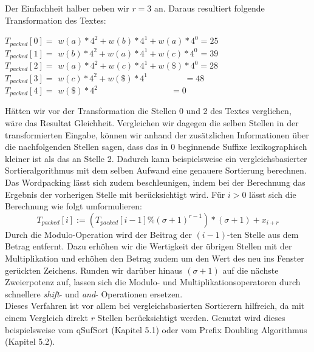 Der Einfachheit halber neben wir $r=3$ an. Daraus resultiert folgende Transformation des Textes:
\begin{flushleft}
$T_{packed}[0]=$ $w(a)* 4^{2}+w(b)* 4^{1}+w(a)*4^{0}=25$\\
$T_{packed}[1]=$ $w(b)* 4^{2}+w(a)* 4^{1}+w(c)*4^{0}\hspace{1pt} =39$\\
$T_{packed}[2]=$ $w(a)* 4^{2}+w(c)* 4^{1}+w(\$)*4^{0}=28$\\
$T_{packed}[3]=$ $w(c)* 4^{2}+w(\$)*4^{1}\hspace{52pt} =48$\\
$T_{packed}[4]=$ $w(\$)* 4^{2}\hspace{103pt}=0$
\end{flushleft}
Hätten wir vor der Transformation die Stellen 0 und 2 des Textes verglichen, wäre das Resultat Gleichheit. Vergleichen wir dagegen die selben Stellen in der transformierten Eingabe, können wir anhand der zusätzlichen Informationen über die nachfolgenden Stellen sagen, dass das in 0 beginnende Suffixe lexikographisch kleiner ist als das an Stelle 2. Dadurch kann beispielsweise ein vergleichsbasierter Sortieralgorithmus mit dem selben Aufwand eine genauere Sortierung berechnen.\\
Das Wordpacking lässt sich zudem beschleunigen, indem bei der Berechnung das Ergebnis der vorherigen Stelle mit berücksichtigt wird. Für $i > 0$ lässt sich die Berechnung wie folgt umformulieren:
\begin{equation}
T_{packed}[i] := (T_{packed}[i-1] \% (\sigma+1)^{r-1})*(\sigma+1) + x_{i+r}
\end{equation}
Durch die Modulo-Operation wird der Beitrag der $(i-1)$-ten Stelle aus dem Betrag entfernt. Dazu erhöhen wir die Wertigkeit der übrigen Stellen mit der Multiplikation und erhöhen den Betrag zudem um den Wert des neu ins Fenster gerückten Zeichens.
Runden wir darüber hinaus $(\sigma+1)$ auf die nächste Zweierpotenz auf, lassen sich die Modulo- und Multiplikationsoperatoren durch schnellere \textit{shift}- und \textit{and}- Operationen ersetzen. \\
Dieses Verfahren ist vor allem bei vergleichsbasierten Sortierern hilfreich, da mit einem Vergleich direkt $r$ Stellen berücksichtigt werden. Genutzt wird dieses beispielsweise vom qSufSort (Kapitel 5.1) oder vom Prefix Doubling Algorithmus (Kapitel 5.2).

